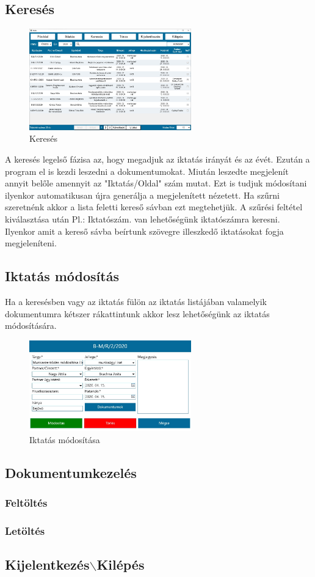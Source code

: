 \documentclass[
]{thesis-ekf}
\theoremstyle{definition}
\theoremstyle{remark}
\begin{document}
\subsection{Keresés}
\begin{figure}[h!]
	\centering
	\includegraphics[width=7cm]{dokukepek/ckereses}
	\caption{Keresés}
	\label{fig:ckereses}
\end{figure}
A keresés legelső fázisa az, hogy megadjuk az iktatás irányát és az évét. Ezután a program el is kezdi leszedni a dokumentumokat. Miután leszedte megjelenít annyit belőle amennyit az "Iktatás/Oldal" szám mutat. Ezt is tudjuk módosítani ilyenkor automatikusan újra generálja a megjelenített nézetett. Ha szűrni szeretnénk akkor a lista feletti kereső sávban ezt megtehetjük. A szűrési feltétel kiválasztása után Pl.: Iktatószám. van lehetőségünk iktatószámra keresni. Ilyenkor amit a kereső sávba beírtunk szövegre illeszkedő iktatásokat fogja megjeleníteni.
\subsection{Iktatás módosítás}
Ha a keresésben vagy az iktatás fülön az iktatás listájában valamelyik dokumentumra kétszer rákattintunk akkor lesz lehetőségünk az iktatás módosítására.
\begin{figure}[h!]
	\centering
	\includegraphics[width=7cm]{dokukepek/ciktatmod}
	\caption{Iktatás módosítása}
	\label{fig:ciktatmod}
\end{figure}

\subsection{Dokumentumkezelés}
\subsubsection{Feltöltés}
\subsubsection{Letöltés}
\subsection{Kijelentkezés$\backslash$Kilépés}
\end{document}
